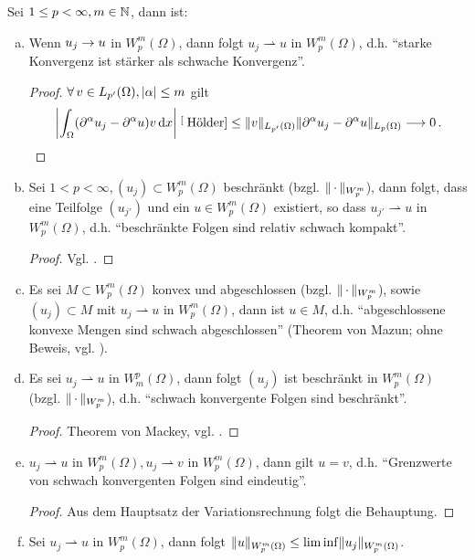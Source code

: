 \begin{bem}
\label{bem:A.13}
Sei $1\leq p < \infty, m \in \mathbb{N}$, dann ist:
\begin{enumerate}[(a)]
\item Wenn $u_j \rightarrow u$ in $W^m_p(\Omega)$, dann folgt $u_j \rightharpoonup u$ in $W^m_p(\Omega)$, d.h. "`starke Konvergenz ist stärker als schwache Konvergenz"'.
\begin{proof}
$\forall \, v \in L_{p'}(\Omega), \lvert \alpha\rvert \leq m$ gilt
\[
	\left\lvert \int_\Omega (\partial^\alpha u_j - \partial^\alpha u) v \,\mathrm{d} x\right\rvert \stackrel[\scriptsize\text{Hölder}]{}\leq \lVert v\rVert_{L_{p'}(\Omega)} \lVert \partial^\alpha u_j -\partial^\alpha u \rVert_{L_p(\Omega)} \longrightarrow 0 \, .\qedhere
\]
\end{proof}
\item Sei $1 < p < \infty, (u_j)\subset W^m_p(\Omega)$ beschränkt (bzgl. $\lVert \, \cdot\, \rVert_{W^m_p}$), dann folgt, dass eine Teilfolge $(u_{j'})$ und ein $u \in W^m_p(\Omega)$ existiert, so dass $u_{j'} \rightharpoonup u$ in $W^m_p(\Omega)$, d.h. "`beschränkte Folgen sind relativ schwach kompakt"'.
\begin{proof}
Vgl. \cite{Rudin}.
\end{proof}
\item Es sei $M\subset W^m_p(\Omega)$ konvex und abgeschlossen (bzgl. $\lVert \, \cdot\, \rVert_{W^m_p}$), sowie $(u_j) \subset M$ mit $u_j \rightharpoonup u $ in $W^m_p(\Omega)$, dann ist $u \in M$, d.h. "`abgeschlossene konvexe Mengen sind schwach abgeschlossen"' (Theorem von Mazun; ohne Beweis, vgl. \cite{Rudin}).
\item Es sei $u_j \rightharpoonup u $ in $W^p_m (\Omega)$, dann folgt $(u_j)$ ist beschränkt in $W^m_p(\Omega)$ (bzgl. $\lVert \, \cdot\, \rVert_{W^m_p}$), d.h. "`schwach konvergente Folgen sind beschränkt"'.
\begin{proof}
Theorem von Mackey, vgl. \cite{Rudin}.
\end{proof}
\item $u_ j \rightharpoonup u $ in $W^m_p(\Omega), u_j \rightharpoonup v$ in $W^m_p(\Omega)$, dann gilt $u=v$, d.h. "`Grenzwerte von schwach konvergenten Folgen sind eindeutig"'.
\begin{proof}
Aus dem Hauptsatz der Variationsrechnung folgt die Behauptung.
\end{proof}
\item Sei $u_j \rightharpoonup u $ in $W^m_p(\Omega)$, dann folgt $\lVert u\rVert_{W^m_p(\Omega)} \leq \lim \inf \lVert u_j\rVert_{W^m_p(\Omega)}$.
\end{enumerate}
\end{bem}

